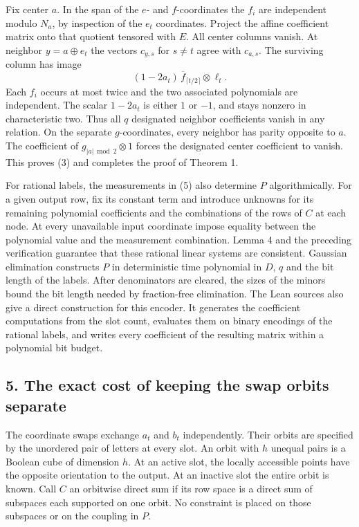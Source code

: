 \documentclass[
  10pt,
]{article}
\begin{document}
Fix center \(a\). In the span of the \(e\)- and \(f\)-coordinates the
\(f_i\) are independent modulo \(N_a\), by inspection of the \(e_t\)
coordinates. Project the affine coefficient matrix onto that quotient
tensored with \(E\). All center columns vanish. At neighbor
\(y=a\oplus e_t\) the vectors \(c_{y,s}\) for \(s\ne t\) agree with
\(c_{a,s}\). The surviving column has image \[
        (1-2a_t)\,\overline f_{\lceil t/2\rceil}\otimes\ell_t.
\] Each \(f_i\) occurs at most twice and the two associated polynomials
are independent. The scalar \(1-2a_t\) is either \(1\) or \(-1\), and
stays nonzero in characteristic two. Thus all \(q\) designated neighbor
coefficients vanish in any relation. On the separate \(g\)-coordinates,
every neighbor has parity opposite to \(a\). The coefficient of
\(g_{|a|\bmod2}\otimes1\) forces the designated center coefficient to
vanish. This proves (3) and completes the proof of Theorem 1.

For rational labels, the measurements in (5) also determine \(P\)
algorithmically. For a given output row, fix its constant term and
introduce unknowns for its remaining polynomial coefficients and the
combinations of the rows of \(C\) at each node. At every unavailable
input coordinate impose equality between the polynomial value and the
measurement combination. Lemma 4 and the preceding verification
guarantee that these rational linear systems are consistent. Gaussian
elimination constructs \(P\) in deterministic time polynomial in \(D\),
\(q\) and the bit length of the labels. After denominators are cleared,
the sizes of the minors bound the bit length needed by fraction-free
elimination.
The Lean sources also give a direct construction for this encoder. It
generates the coefficient computations from the slot count, evaluates
them on binary encodings of the rational labels, and writes every
coefficient of the resulting matrix within a polynomial bit budget.

\subsection{5. The exact cost of keeping the swap orbits
separate}\label{the-exact-cost-of-keeping-the-swap-orbits-separate}

The coordinate swaps exchange \(a_t\) and \(b_t\) independently. Their
orbits are specified by the unordered pair of letters at every slot. An
orbit with \(h\) unequal pairs is a Boolean cube of dimension \(h\). At
an active slot, the locally accessible points have the opposite
orientation to the output. At an inactive slot the entire orbit is
known. Call \(C\) an orbitwise direct sum if its row space is a direct
sum of subspaces each supported on one orbit. No constraint is placed on
those subspaces or on the coupling in \(P\).
\end{document}
